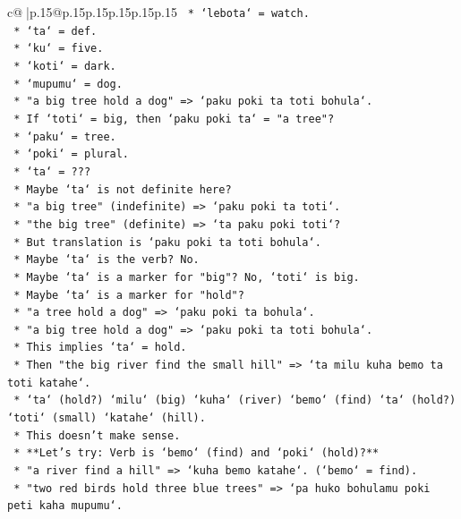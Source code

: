 \documentclass{article}
\begin{document}
{\begin{supertabular}{c@{$\;$}|p{.15\linewidth}@{}p{.15\linewidth}p{.15\linewidth}p{.15\linewidth}p{.15\linewidth}p{.15\linewidth}}
{{{\texttt{        *   `lebota` = watch.} \\
\texttt{        *   `ta` = def.} \\
\texttt{        *   `ku` = five.} \\
\texttt{        *   `koti` = dark.} \\
\texttt{        *   `mupumu` = dog.} \\
\texttt{    *   "a big tree hold a dog" => `paku poki ta toti bohula`.} \\
\texttt{        *   If `toti` = big, then `paku poki ta` = "a tree"?} \\
\texttt{        *   `paku` = tree.} \\
\texttt{        *   `poki` = plural.} \\
\texttt{        *   `ta` = ???} \\
\texttt{        *   Maybe `ta` is not definite here?} \\
\texttt{        *   "a big tree" (indefinite) => `paku poki ta toti`.} \\
\texttt{        *   "the big tree" (definite) => `ta paku poki toti`?} \\
\texttt{        *   But translation is `paku poki ta toti bohula`.} \\
\texttt{        *   Maybe `ta` is the verb? No.} \\
\texttt{        *   Maybe `ta` is a marker for "big"? No, `toti` is big.} \\
\texttt{        *   Maybe `ta` is a marker for "hold"?} \\
\texttt{        *   "a tree hold a dog" => `paku poki ta bohula`.} \\
\texttt{        *   "a big tree hold a dog" => `paku poki ta toti bohula`.} \\
\texttt{        *   This implies `ta` = hold.} \\
\texttt{        *   Then "the big river find the small hill" => `ta milu kuha bemo ta toti katahe`.} \\
\texttt{            *   `ta` (hold?) `milu` (big) `kuha` (river) `bemo` (find) `ta` (hold?) `toti` (small) `katahe` (hill).} \\
\texttt{            *   This doesn't make sense.} \\
\texttt{    *   **Let's try: Verb is `bemo` (find) and `poki` (hold)?**} \\
\texttt{        *   "a river find a hill" => `kuha bemo katahe`. (`bemo` = find).} \\
\texttt{        *   "two red birds hold three blue trees" => `pa huko bohulamu poki peti kaha mupumu`.} \\
}}}
\end{supertabular}}
\end{document}
